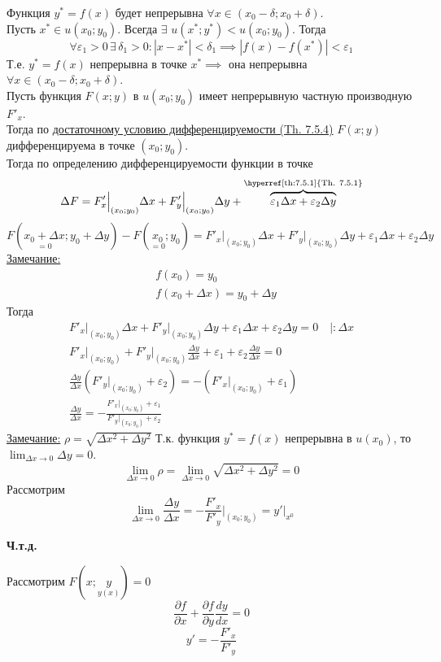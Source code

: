 \documentclass[12pt]{article}
\begin{document}
\begin{adjustwidth}{1.5em}{1.5em}
        Функция $y^* = f(x)$ будет непрерывна $\forall x \in (x_0 - \delta; x_0 + \delta)$.\\
        Пусть $x^* \in u(x_0; y_0)$. Всегда $\exists$ $u(x^*; y^*) < u(x_0; y_0)$. Тогда
        \[ \forall \varepsilon_1 > 0\, \exists\, \delta_1 > 0 : |x - x^*| < \delta_1 \implies | f(x) - f(x^*)| < \varepsilon_1 \]
        Т.е. $y^* = f(x)$ непрерывна в точке $x^* \implies$ она непрерывна $\forall x \in (x_0 - \delta; x_0 + \delta)$.\\
        Пусть функция $F(x; y)$ в $u(x_0; y_0)$ имеет непрерывную частную производную $F'_x$.\\
        Тогда по \hyperref[th:7.5.4]{достаточному условию дифференцируемости (Th. 7.5.4)} $F(x; y)$ дифференцируема в точке $(x_0; y_0)$.\\
        Тогда по определению дифференцируемости функции в точке
        \[ \Delta F = F'_x \Big|_{(x_0; y_0)} \Delta x + F'_y \Big|_{(x_0; y_0)} \Delta y + \overbrace{\varepsilon_1 \Delta x + \varepsilon_2 \Delta y}^{\text{\hyperref[th:7.5.1]{Th. 7.5.1}}} \]
        \[ F(\underset{=0}{x_0 + \Delta x}; y_0 + \Delta y) - F(\underset{=0}{x_0}; y_0) = F'_x \Big|_{(x_0; y_0)} \Delta x + F'_y \Big|_{(x_0; y_0)} \Delta y + \varepsilon_1 \Delta x + \varepsilon_2 \Delta y \]
        \underline{Замечание:} 
        \[ \begin{aligned}
            &f(x_0) = y_0\\
            &f(x_0 + \Delta x) = y_0 + \Delta y
        \end{aligned} \]
        Тогда
        \begin{gather*}
            F'_x \Big|_{(x_0; y_0)} \Delta x + F'_y \Big|_{(x_0; y_0)} \Delta y + \varepsilon_1 \Delta x + \varepsilon_2 \Delta y = 0 \quad \Big| : \Delta x\\
            F'_x \Big|_{(x_0; y_0)} + F'_y \Big|_{(x_0; y_0)} \frac{\Delta y}{\Delta x} + \varepsilon_1 + \varepsilon_2 \frac{\Delta y}{\Delta x} = 0\\
            \frac{\Delta y}{\Delta x} \left( F'_y \Big|_{(x_0; y_0)} + \varepsilon_2 \right) = - \left( F'_x \Big|_{(x_0; y_0)} + \varepsilon_1 \right)\\
            \frac{\Delta y}{\Delta x} = - \frac{F'_x \Big|_{(x_0; y_0)} + \varepsilon_1}{F'_y \Big|_{(x_0; y_0)} + \varepsilon_2}
        \end{gather*}
        \underline{Замечание:} $\rho = \sqrt{\Delta x^2 + \Delta y^2}$
        Т.к. функция $y^* = f(x)$ непрерывна в $u(x_0)$, то $\lim_{\Delta x \to 0} \Delta y = 0$.
        \[
            \lim_{\Delta x \to 0}\rho = \lim_{\Delta x \to 0} \sqrt{\Delta x^2 + \Delta y^2} = 0
        \]
        Рассмотрим
        \[ \lim_{\Delta x \to 0} \frac{\Delta y}{\Delta x} = \boxed{ - \frac{F'_x}{F'_y} \Big|_{(x_0; y_0)} = y' \Big|_{x^0} } \]
        \begin{center}
            \textbf{Ч.т.д.}
        \end{center}
    \end{adjustwidth}
    Рассмотрим $F(x; \underset{y(x)}{y}) = 0$
    \[ \frac{\partial f}{\partial x} + \frac{\partial f}{\partial y} \frac{dy}{dx} = 0 \]
    \[ y' = - \frac{F'_x}{F'_y} \]
\end{document}
